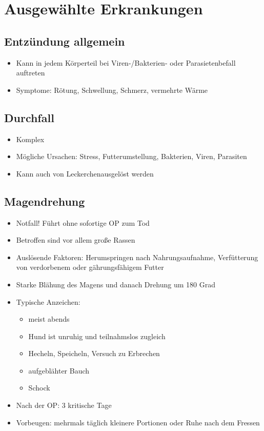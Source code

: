 \section{Ausgewählte Erkrankungen}


    \subsection{Entzündung allgemein}
    \begin{itemize}
        \item Kann in jedem Körperteil bei Viren-/Bakterien- oder Parasietenbefall auftreten
        \item Symptome: Rötung, Schwellung, Schmerz, vermehrte Wärme
    \end{itemize}

    \subsection{Durchfall}
    \begin{itemize}
        \item Komplex
        \item Mögliche Ursachen: Stress, Futterumstellung, Bakterien, Viren, Parasiten
        \item Kann auch von \glqq Leckerchen\grqq ausgelöst werden
    \end{itemize}

    \subsection{Magendrehung}
    \begin{itemize}
        \item Notfall! Führt ohne sofortige OP zum Tod
        \item Betroffen sind vor allem große Rassen
        \item Auslösende Faktoren: Herumspringen nach Nahrungsaufnahme, Verfütterung von verdorbenem oder gährungsfähigem Futter
        \item Starke Blähung des Magens und danach Drehung um 180 Grad
        \item Typische Anzeichen:
        \begin{itemize}
            \item meist abends
            \item Hund ist unruhig und teilnahmslos zugleich
            \item Hecheln, Speicheln, Versuch zu Erbrechen
            \item aufgeblähter Bauch
            \item Schock
        \end{itemize}
        \item Nach der OP: 3 kritische Tage
        \item Vorbeugen: mehrmals täglich kleinere Portionen oder Ruhe nach dem Fressen
    \end{itemize}

